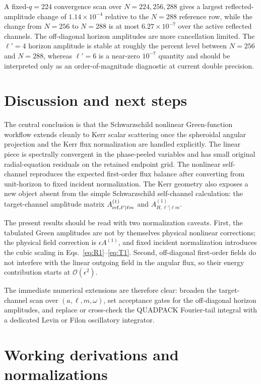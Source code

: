 \documentclass[aps,prd,twocolumn,nofootinbib,superscriptaddress,10pt,floatfix]{revtex4-2}
\newcommand{\calO}{\mathcal{O}}
\begin{document}
A fixed-$q=224$ convergence scan over $N=224,256,288$ gives a largest
reflected-amplitude change of $1.14\times10^{-4}$ relative to the $N=288$
reference row, while the change from $N=256$ to $N=288$ is at most
$6.27\times10^{-7}$ over the active reflected channels.  The off-diagonal
horizon amplitudes are more cancellation limited.  The $\ell'=4$ horizon
amplitude is stable at roughly the percent level between $N=256$ and $N=288$,
whereas $\ell'=6$ is a near-zero $10^{-7}$ quantity and should be interpreted
only as an order-of-magnitude diagnostic at current double precision.

\section{Discussion and next steps}

The central conclusion is that the Schwarzschild nonlinear Green-function
workflow extends cleanly to Kerr scalar scattering once the spheroidal angular
projection and the Kerr flux normalization are handled explicitly.  The linear
piece is spectrally convergent in the phase-peeled variables and has small
original radial-equation residuals on the retained endpoint grid.
The nonlinear self-channel reproduces the expected first-order flux balance
after converting from unit-horizon to fixed incident normalization.  The Kerr
geometry also exposes a new object absent from the simple Schwarzschild
self-channel calculation: the target-channel amplitude matrix
$A_{{\rm ref},\ell'|\ell m}^{(1)}$ and $A_{H,\ell'|\ell m}^{(1)}$.

The present results should be read with two normalization caveats.  First, the
tabulated Green amplitudes are not by themselves physical nonlinear
corrections; the physical field correction is $\epsilon A^{(1)}$, and fixed
incident normalization introduces the cubic scaling in
Eqs.~\eqref{eq:R1}--\eqref{eq:T1}.  Second, off-diagonal first-order fields do
not interfere with the linear outgoing field in the angular flux, so their
energy contribution starts at $\calO(\epsilon^2)$.

The immediate numerical extensions are therefore clear: broaden the
target-channel scan over $(a,\ell,m,\omega)$, set acceptance gates for the
off-diagonal horizon amplitudes, and replace or cross-check the QUADPACK
Fourier-tail integral with a dedicated Levin or Filon oscillatory integrator.

\clearpage

\appendix

\section{Working derivations and normalizations}
\label{app:details}
\end{document}

